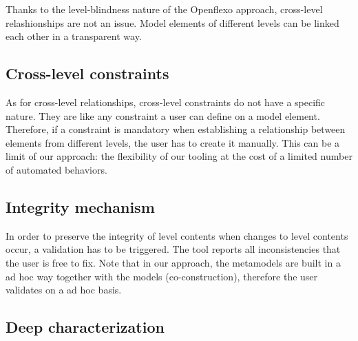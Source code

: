   Thanks to the level-blindness nature of the Openflexo approach, cross-level
  relashionships are not an issue. Model elements of different levels can be
  linked each other in a transparent way. %

  \subsection{Cross-level constraints}


  As for cross-level relationships, cross-level constraints do not have a
  specific nature. They are like any constraint a user can define on a model
  element. Therefore, if a constraint is mandatory when establishing a
  relationship between elements from different levels, the user has to create
  it manually. This can be a limit of our approach: the flexibility of our
  tooling at the cost of a limited number of automated behaviors. 
  

  \subsection{Integrity mechanism}


  In order to preserve the integrity of level contents when changes to level
  contents occur, a validation has to be triggered. The tool reports all
  inconsistencies that the user is free to fix. Note that in our approach, the
  metamodels are built in a ad hoc way together with the models
  (co-construction), therefore the user validates on a ad hoc basis.

  \subsection{Deep characterization}



